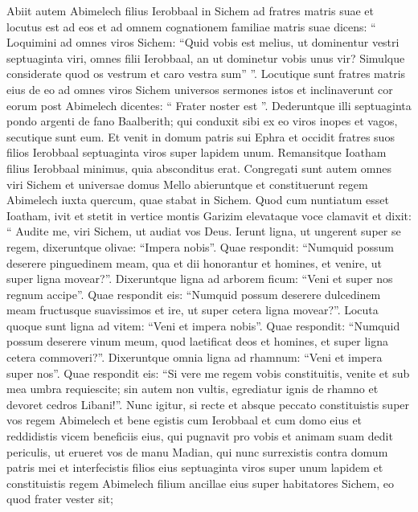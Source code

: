 \begin{biblechapter}
\begin{biblechapter}
\begin{biblechapter}
\begin{biblechapter}
\begin{biblechapter}
\begin{biblechapter}
\begin{biblechapter}
\begin{biblechapter}
\begin{biblechapter}
\verse Abiit autem Abimelech filius Ierobbaal in Sichem ad fratres matris suae et locutus est ad eos et ad omnem cognationem familiae matris suae dicens: 
\verse “ Loquimini ad omnes viros Sichem: “Quid vobis est melius, ut dominentur vestri septuaginta viri, omnes filii Ierobbaal, an ut dominetur vobis unus vir? Simulque considerate quod os vestrum et caro vestra sum” ”. 
\verse Locutique sunt fratres matris eius de eo ad omnes viros Sichem universos sermones istos et inclinaverunt cor eorum post Abimelech dicentes: “ Frater noster est ”. 
\verse Dederuntque illi septuaginta pondo argenti de fano Baalberith; qui conduxit sibi ex eo viros inopes et vagos, secutique sunt eum. 
\verse Et venit in domum patris sui Ephra et occidit fratres suos filios Ierobbaal septuaginta viros super lapidem unum. Remansitque Ioatham filius Ierobbaal minimus, quia absconditus erat. 
\verse Congregati sunt autem omnes viri Sichem et universae domus Mello abieruntque et constituerunt regem Abimelech iuxta quercum, quae stabat in Sichem.
 \verse Quod cum nuntiatum esset Ioatham, ivit et stetit in vertice montis Garizim elevataque voce clamavit et dixit: “ Audite me, viri Sichem, ut audiat vos Deus. 
 \verse Ierunt ligna, ut ungerent super se regem, dixeruntque olivae: “Impera nobis”. 
 \verse Quae respondit: “Numquid possum deserere pinguedinem meam, qua et dii honorantur et homines, et venire, ut super ligna movear?”. 
\verse Dixeruntque ligna ad arborem ficum: “Veni et super nos regnum accipe”.
 \verse Quae respondit eis: “Numquid possum deserere dulcedinem meam fructusque suavissimos et ire, ut super cetera ligna movear?”. 
\verse Locuta quoque sunt ligna ad vitem: “Veni et impera nobis”. 
\verse Quae respondit: “Numquid possum deserere vinum meum, quod laetificat deos et homines, et super ligna cetera commoveri?”. 
\verse Dixeruntque omnia ligna ad rhamnum: “Veni et impera super nos”. 
\verse Quae respondit eis: “Si vere me regem vobis constituitis, venite et sub mea umbra requiescite; sin autem non vultis, egrediatur ignis de rhamno et devoret cedros Libani!”. 
\verse Nunc igitur, si recte et absque peccato constituistis super vos regem Abimelech et bene egistis cum Ierobbaal et cum domo eius et reddidistis vicem beneficiis eius, 
\verse qui pugnavit pro vobis et animam suam dedit periculis, ut erueret vos de manu Madian, 
\verse qui nunc surrexistis contra domum patris mei et interfecistis filios eius septuaginta viros super unum lapidem et constituistis regem Abimelech filium ancillae eius super habitatores Sichem, eo quod frater vester sit; 

\end{biblechapter}
\end{biblechapter}
\end{biblechapter}
\end{biblechapter}
\end{biblechapter}
\end{biblechapter}
\end{biblechapter}
\end{biblechapter}
\end{biblechapter}
